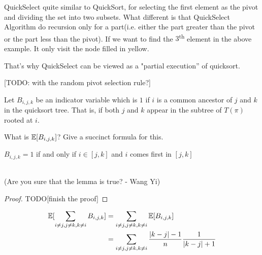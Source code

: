 \documentclass[11pt,a4paper,oneside]{article}
\newcommand{\nth}[1]{#1\textsuperscript{th}}
\newcommand{\E}{\mathop{\mathbb{E\/}}}
\begin{document}
\begin{problem}{5}
QuickSelect quite similar to QuickSort, for selecting the first element as the pivot and dividing the set into two subsets. What different is that QuickSelect Algorithm do recursion only for a part(i.e. either the part greater than the pivot or the part less than the pivot). If we want to find the \nth{\(3\)} element in the above example. It only visit the node filled in yellow.

That's why QuickSelect can be viewed as a "partial execution'' of quicksort.

[TODO: with the random pivot selection rule?]

\end{problem}

\begin{problem}{6}
\statement
Let $B_{i,j,k}$ be an indicator variable which is $1$ if $i$ is a common ancestor
of $j$ and $k$ in the quicksort tree. That is, if both $j$ and $k$ appear in the 
subtree of $T(\pi)$ rooted at $i$.

What is $\E[B_{i,j,k}]$? Give a succinct formula for this.

\solution
\begin{lemma}
	\(B_{i, j, k} = 1\) if and only if \(i \in [j, k]\) and \(i\) comes first in \([j, k]\)
\end{lemma}
\\(Are you sure that the lemma is true? - Wang Yi)
\begin{proof}
	TODO[finish the proof]
\end{proof}

\[
	\begin{split}
		\E[\sum_{i \not= j, j \not= k, k \not= i}B_{i, j, k}] &= \sum_{i \not= j, j \not= k, k \not= i} \E[B_{i,j,k}] \\
		&= \sum_{i \not= j, j \not= k, k \not= i} \frac{|k - j| - 1}{n} \frac{1}{|k - j| + 1} \\
	\end{split}
\]
\end{problem}
\end{document}
